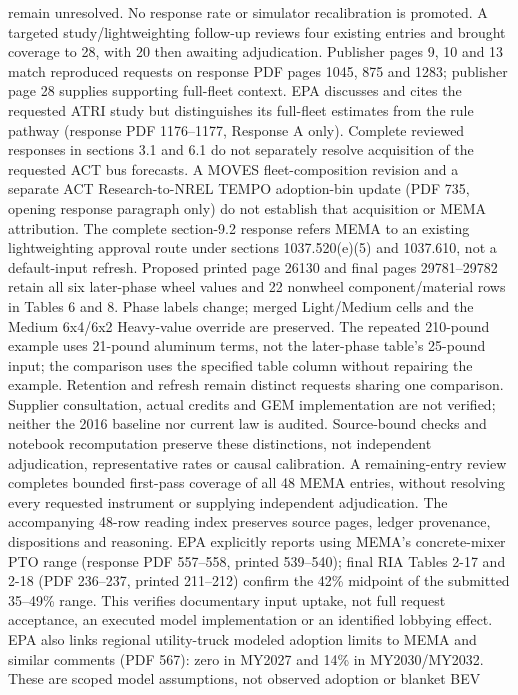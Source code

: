 remain unresolved. No response rate or simulator recalibration is promoted.
A targeted study/lightweighting follow-up reviews four existing entries and
brought coverage to 28, with 20 then awaiting adjudication. Publisher pages
9, 10 and 13 match reproduced requests on response PDF pages 1045, 875 and 1283;
publisher page 28 supplies supporting full-fleet context. EPA discusses and
cites the requested ATRI study but distinguishes its full-fleet estimates from
the rule pathway (response PDF 1176--1177, Response A only). Complete reviewed
responses in sections 3.1 and 6.1 do not separately resolve acquisition of the
requested ACT bus forecasts. A MOVES fleet-composition revision and a separate
ACT Research-to-NREL TEMPO adoption-bin update (PDF 735, opening response
paragraph only) do not establish that acquisition or MEMA attribution.
The complete section-9.2 response refers MEMA to an existing lightweighting
approval route under sections 1037.520(e)(5) and 1037.610, not a default-input
refresh. Proposed printed page 26130 and final pages 29781--29782 retain all
six later-phase wheel values and 22 nonwheel component/material rows in
Tables 6 and 8. Phase labels change; merged Light/Medium cells and the Medium
6x4/6x2 Heavy-value override are preserved. The repeated 210-pound example
uses 21-pound aluminum terms, not the later-phase table's 25-pound input;
the comparison uses the specified table column without repairing the example.
Retention and refresh remain distinct requests sharing one comparison. Supplier
consultation, actual credits and GEM implementation are not verified; neither
the 2016 baseline nor current law is audited. Source-bound checks and notebook
recomputation preserve these distinctions, not independent adjudication,
representative rates or causal calibration.
A remaining-entry review completes bounded first-pass coverage of all 48
MEMA entries, without resolving every requested instrument or supplying
independent adjudication. The accompanying 48-row reading index preserves
source pages, ledger provenance, dispositions and reasoning. EPA explicitly
reports using MEMA's concrete-mixer PTO range (response PDF 557--558,
printed 539--540); final RIA Tables 2-17 and 2-18 (PDF 236--237,
printed 211--212) confirm the 42\% midpoint of the submitted 35--49\% range.
This verifies documentary input uptake, not full request acceptance, an
executed model implementation or an identified lobbying effect.
EPA also links regional utility-truck modeled adoption limits to MEMA and
similar comments (PDF 567): zero in MY2027 and 14\% in MY2030/MY2032.
These are scoped model assumptions, not observed adoption or blanket BEV
